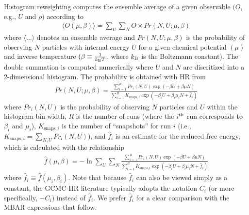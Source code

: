 \documentclass[journal=jced,manuscript=article]{achemso}
\begin{document}
Histogram reweighting computes the ensemble average of a given observable $(O$, e.g., $U$ and $\rho)$ according to
\begin{eqnarray} \label{eq: HR ave}
\langle O(\mu,\beta) \rangle = \sum_{U} \sum_{N} O \times Pr(N,U;\mu,\beta)
\end{eqnarray}
where $\langle \dots \rangle$ denotes an ensemble average and $Pr(N,U;\mu,\beta)$ is the probability of observing $N$ particles with internal energy $U$ for a given chemical potential $(\mu)$ and inverse temperature $(\beta \equiv \frac{1}{k_{\rm B}T}$, where $k_{\rm B}$ is the Boltzmann constant). The double summation is computed numerically where $U$ and $N$ are discritized into a 2-dimensional histogram. The probability is obtained with HR from
\begin{eqnarray} \label{eq: HR prob}
Pr(N,U;\mu,\beta) = \frac{\sum_{i=1}^{R} Pr_i(N,U)  \exp(-\beta U + \beta \mu N)}{\sum_{i=1}^{R} K_{\mathrm{snaps}, i} \exp(-\beta_i U + \beta_i \mu_i N + \hat f_i)}
\end{eqnarray}
where $Pr_i(N,U)$ is the probability of observing $N$ particles and $U$ within the histogram bin width, $R$ is the number of runs (where the $i^{\rm th}$ run corresponds to $\beta_i$ and $\mu_i$), $K_{\mathrm{snaps}, i}$ is the number of ``snapshots'' for run $i$ (i.e., $K_{\mathrm{snaps}, i} = \sum_{N,U} Pr_i(N,U)$), and $\hat f_i$ is an estimate for the reduced free energy, which is calculated with the relationship
\begin{eqnarray} \label{eq: Weights}
\hat f(\mu,\beta) = - \ln \sum_{U} \sum_{N} \frac{\sum_{i=1}^{R} Pr_i(N,U) \exp(-\beta U + \beta \mu N)}{\sum_{i=1}^{R} K_{\mathrm{snaps}, i} \exp(-\beta_i U + \beta_i \mu_i N + \hat f_i)}
\end{eqnarray}
where $\hat f_i \equiv \hat f(\mu_i,\beta_i)$. Note that because $\hat f_i$ can also be viewed simply as a constant, the GCMC-HR literature \cite{Pana2000} typically adopts the notation $C_i$ (or more specifically, $-C_i$) instead of $\hat f_i$. We prefer $\hat f_i$ for a clear comparison with the MBAR expressions that follow.
\end{document}
